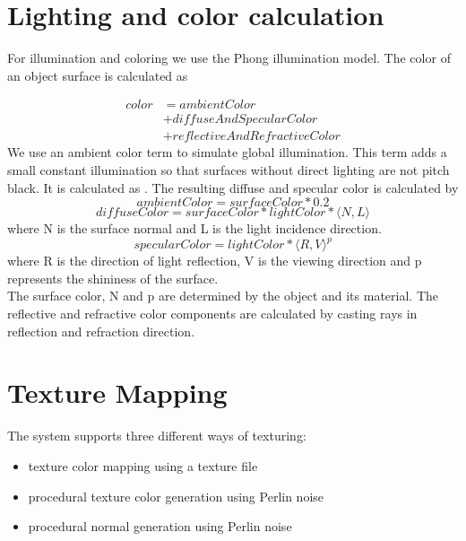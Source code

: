 \documentclass[sigconf, nonacm]{acmart}
\begin{document}
\clearpage

\section{Lighting and color calculation}
For illumination and coloring we use the Phong illumination model. The color of an object surface is calculated as

\begin{equation}
  \begin{split}
      color &= ambientColor \\
      &+ diffuseAndSpecularColor \\
      &+ reflectiveAndRefractiveColor
  \end{split}
\end{equation}
We use an ambient color term to simulate global illumination. This term adds a small constant illumination so that surfaces without direct lighting are not pitch black.
It is calculated as . The resulting diffuse and specular color is calculated by
\[ambientColor=surfaceColor*0.2\]
\[diffuseColor=surfaceColor*lightColor*\langle N,L \rangle\] 
where N is the surface normal and L is the light incidence direction. 
\[specularColor=lightColor* \langle R, V \rangle^p\]
where R is the direction of light reflection, V is the viewing direction and p represents
the shininess of the surface.\\
The surface color, N and p are determined by the object and its material.
The reflective and refractive color components are calculated by casting rays in reflection and refraction direction.


\section{Texture Mapping}
The system supports three different ways of texturing:
\begin{itemize}
  \item texture color mapping using a texture file
  \item procedural texture color generation using Perlin noise
  \item procedural normal generation using Perlin noise
\end{itemize}
\end{document}
